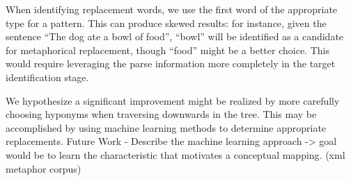 \documentclass[12pt]{article}
\begin{document}
When identifying replacement words, we use the first word of the appropriate type for a pattern.  This can produce skewed results: for instance, given the sentence ``The dog ate a bowl of food'', ``bowl'' will be identified as a candidate for metaphorical replacement, though ``food'' might be a better choice.  This would require leveraging the parse information more completely in the target identification stage.

We hypothesize a significant improvement might be realized by more carefully choosing hyponyms when traversing downwards in the tree.  This may be accomplished by using machine learning methods to determine appropriate replacements.
Future Work - Describe the machine learning approach -> goal would be to learn the characteristic that motivates a conceptual mapping.  (xml metaphor corpus)
\end{document}
